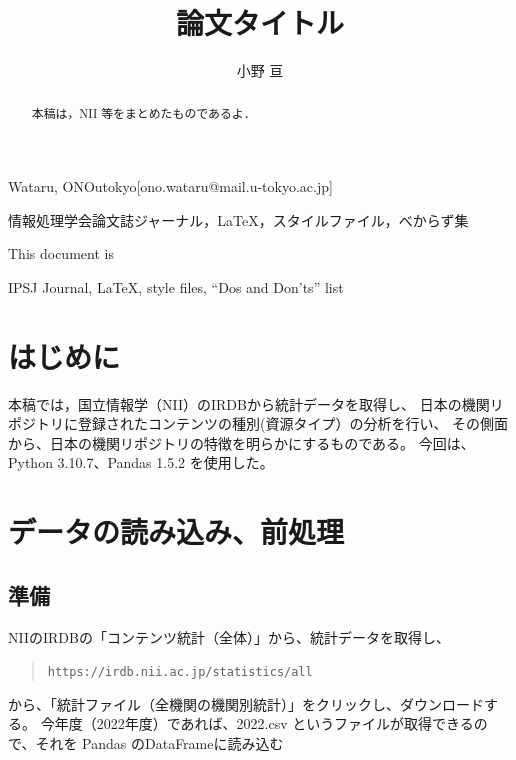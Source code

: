 \documentclass[submit,noauthor]{ono}
\def\|{\verb|}
\begin{document}
\title{論文タイトル\\}



\author{小野 亘}{Wataru, ONO}{utokyo}[ono.wataru@mail.u-tokyo.ac.jp]

\begin{abstract}
	本稿は，NII 等をまとめたものであるよ．
\end{abstract}


\begin{jkeyword}
	情報処理学会論文誌ジャーナル，\LaTeX，スタイルファイル，べからず集
\end{jkeyword}

\begin{eabstract}
	This document is
\end{eabstract}

\begin{ekeyword}
	IPSJ Journal, \LaTeX, style files, ``Dos and Don'ts'' list
\end{ekeyword}

\maketitle

%1
\section{はじめに}

本稿では，国立情報学（NII）のIRDBから統計データを取得し、
日本の機関リポジトリに登録されたコンテンツの種別(資源タイプ）の分析を行い、
その側面から、日本の機関リポジトリの特徴を明らかにするものである。
今回は、Python 3.10.7、Pandas 1.5.2 を使用した。


%=====================

%2
\section{データの読み込み、前処理}
%2.1
\subsection{準備}

NIIのIRDBの「コンテンツ統計（全体）」から、統計データを取得し、
\begin{quote}
	\small
	\|https://irdb.nii.ac.jp/statistics/all|
\end{quote}
から、「統計ファイル（全機関の機関別統計）」をクリックし、ダウンロードする。
今年度（2022年度）であれば、2022.csv というファイルが取得できるので、それを
Pandas のDataFrameに読み込む
\end{document}
